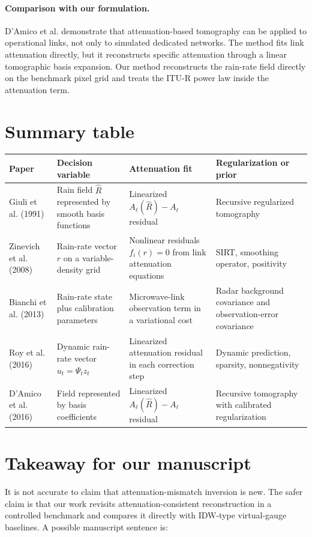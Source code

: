 \documentclass[11pt]{article}
\newcommand{\Rhat}{\hat{R}}
\begin{document}
\paragraph{Comparison with our formulation.}
D'Amico et al. demonstrate that attenuation-based tomography can be applied to operational links, not only to simulated dedicated networks.
The method fits link attenuation directly, but it reconstructs specific attenuation through a linear tomographic basis expansion.
Our method reconstructs the rain-rate field directly on the benchmark pixel grid and treats the ITU-R power law inside the attenuation term.

\section*{Summary table}
\begin{center}
\small
\renewcommand{\arraystretch}{1.25}
\begin{tabular}{>{\raggedright\arraybackslash}p{}>{\raggedright\arraybackslash}p{}>{\raggedright\arraybackslash}p{}>{\raggedright\arraybackslash}p{}}
\toprule
Paper & Decision variable & Attenuation fit & Regularization or prior \\
\midrule
Giuli et al. (1991) & Rain field $\Rhat$ represented by smooth basis functions & Linearized $A_\ell(\Rhat)-A_\ell$ residual & Recursive regularized tomography \\
Zinevich et al. (2008) & Rain-rate vector $r$ on a variable-density grid & Nonlinear residuals $f_i(r)=0$ from link attenuation equations & SIRT, smoothing operator, positivity \\
Bianchi et al. (2013) & Rain-rate state plus calibration parameters & Microwave-link observation term in a variational cost & Radar background covariance and observation-error covariance \\
Roy et al. (2016) & Dynamic rain-rate vector $u_t=\Psi_tz_t$ & Linearized attenuation residual in each correction step & Dynamic prediction, sparsity, nonnegativity \\
D'Amico et al. (2016) & Field represented by basis coefficients & Linearized $A_\ell(\Rhat)-A_\ell$ residual & Recursive tomography with calibrated regularization \\
\bottomrule
\end{tabular}
\end{center}

\section*{Takeaway for our manuscript}
It is not accurate to claim that attenuation-mismatch inversion is new.
The safer claim is that our work revisits attenuation-consistent reconstruction in a controlled benchmark and compares it directly with IDW-type virtual-gauge baselines.
A possible manuscript sentence is:
\end{document}
